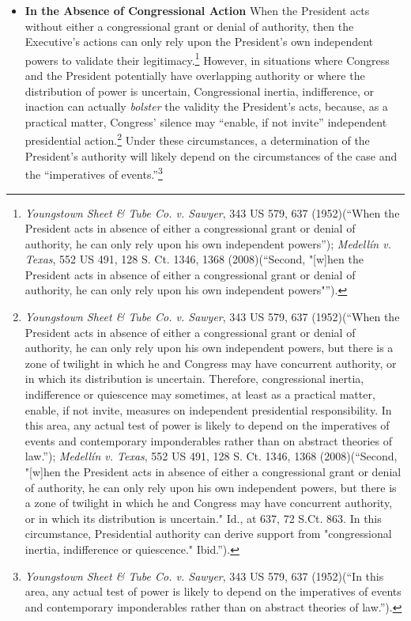\begin{itemize}
\item \textbf{In the Absence of Congressional Action} When the President acts without either a congressional grant or denial of authority, then the Executive's actions can only rely upon the President's own independent powers to validate their legitimacy.\footnote{\textit{Youngstown Sheet \& Tube Co. v. Sawyer}, 343 US 579, 637 (1952)(``When the President acts in absence of either a congressional grant or denial of authority, he can only rely upon his own independent powers''); \textit{Medellín v. Texas}, 552 US 491, 128 S. Ct. 1346, 1368 (2008)(``Second, "[w]hen the President acts in absence of either a congressional grant or denial of authority, he can only rely upon his own independent powers"'').}
However, in situations where Congress and the President potentially have overlapping authority or where the distribution of power is uncertain, Congressional inertia, indifference, or inaction can actually \textit{bolster} the validity the President's acts, because, as a practical matter, Congress' silence may ``enable, if not invite'' independent presidential action.\footnote{\textit{Youngstown Sheet \& Tube Co. v. Sawyer}, 343 US 579, 637 (1952)(``When the President acts in absence of either a congressional grant or denial of authority, he can only rely upon his own independent powers, but there is a zone of twilight in which he and Congress may have concurrent authority, or in which its distribution is uncertain. Therefore, congressional inertia, indifference or quiescence may sometimes, at least as a practical matter, enable, if not invite, measures on independent presidential responsibility. In this area, any actual test of power is likely to depend on the imperatives of events and contemporary imponderables rather than on abstract theories of law.''); \textit{Medellín v. Texas}, 552 US 491, 128 S. Ct. 1346, 1368 (2008)(``Second, "[w]hen the President acts in absence of either a congressional grant or denial of authority, he can only rely upon his own independent powers, but there is a zone of twilight in which he and Congress may have concurrent authority, or in which its distribution is uncertain." Id., at 637, 72 S.Ct. 863. In this circumstance, Presidential authority can derive support from "congressional inertia, indifference or quiescence." Ibid.'').}
Under these circumstances, a determination of the President's authority will likely depend on the circumstances of the case and the ``imperatives of events.''\footnote{\textit{Youngstown Sheet \& Tube Co. v. Sawyer}, 343 US 579, 637 (1952)(``In this area, any actual test of power is likely to depend on the imperatives of events and contemporary imponderables rather than on abstract theories of law.'').}


\end{itemize}
